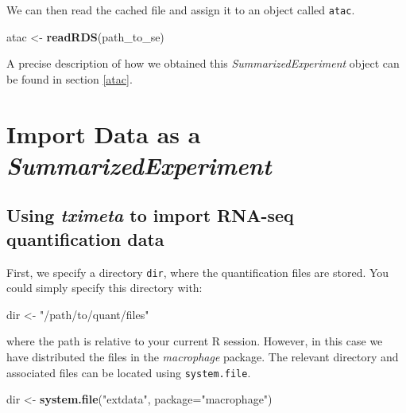 \documentclass[
]{article}
\newenvironment{Shaded}{}{}
\newcommand{\DataTypeTok}[1]{\textcolor[rgb]{0.56,0.13,0.00}{#1}}
\newcommand{\KeywordTok}[1]{\textcolor[rgb]{0.00,0.44,0.13}{\textbf{#1}}}
\newcommand{\NormalTok}[1]{#1}
\newcommand{\StringTok}[1]{\textcolor[rgb]{0.25,0.44,0.63}{#1}}
\begin{document}
We can then read the cached file and assign it to an object called \texttt{atac}.

\begin{Shaded}
\begin{Highlighting}[]
\NormalTok{atac <-}\StringTok{ }\KeywordTok{readRDS}\NormalTok{(path_to_se)}
\end{Highlighting}
\end{Shaded}

A precise description of how we obtained this \emph{SummarizedExperiment} object can
be found in section \ref{atac}.

\hypertarget{se}{%
\section{\texorpdfstring{Import Data as a \emph{SummarizedExperiment}}{Import Data as a SummarizedExperiment}}\label{se}}

\hypertarget{using-tximeta-to-import-rna-seq-quantification-data}{%
\subsection{\texorpdfstring{Using \emph{tximeta} to import RNA-seq quantification data}{Using tximeta to import RNA-seq quantification data}}\label{using-tximeta-to-import-rna-seq-quantification-data}}

First, we specify a directory \texttt{dir}, where the quantification files are stored.
You could simply specify this directory with:

\begin{Shaded}
\begin{Highlighting}[]
\NormalTok{dir <-}\StringTok{ "/path/to/quant/files"}
\end{Highlighting}
\end{Shaded}

where the path is relative to your current R session. However, in this case we
have distributed the files in the \emph{macrophage} package. The relevant directory
and associated files can be located using \texttt{system.file}.

\begin{Shaded}
\begin{Highlighting}[]
\NormalTok{dir <-}\StringTok{ }\KeywordTok{system.file}\NormalTok{(}\StringTok{"extdata"}\NormalTok{, }\DataTypeTok{package=}\StringTok{"macrophage"}\NormalTok{)}
\end{Highlighting}
\end{Shaded}
\end{document}
